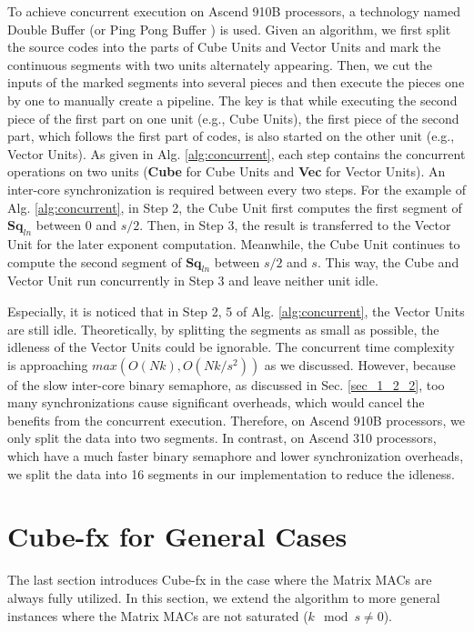 To achieve concurrent execution on Ascend 910B processors, a technology named Double Buffer (or Ping Pong Buffer \cite{DBLP:conf/infocom/JooM98}) is used. Given an algorithm, we first split the source codes into the parts of Cube Units and Vector Units and mark the continuous segments with two units alternately appearing. Then, we cut the inputs of the marked segments into several pieces and then execute the pieces one by one to manually create a pipeline. The key is that while executing the second piece of the first part on one unit (e.g., Cube Units), the first piece of the second part, which follows the first part of codes, is also started on the other unit (e.g., Vector Units). As given in Alg. \ref{alg:concurrent}, each step contains the concurrent operations on two units (\textbf{Cube} for Cube Units and \textbf{Vec} for Vector Units). An inter-core synchronization is required between every two steps. For the example of Alg. \ref{alg:concurrent}, in Step 2, the Cube Unit first computes the first segment of $\textbf{Sq}_{ln}$ between $0$ and $s / 2$. Then, in Step 3, the result is transferred to the Vector Unit for the later exponent computation. Meanwhile, the Cube Unit continues to compute the second segment of $\textbf{Sq}_{ln}$ between $s / 2$ and $s$. This way, the Cube and Vector Unit run concurrently in Step 3 and leave neither unit idle.

Especially, it is noticed that in Step 2, 5 of Alg. \ref{alg:concurrent}, the Vector Units are still idle. Theoretically, by splitting the segments as small as possible, the idleness of the Vector Units could be ignorable. The concurrent time complexity is approaching $max(O(Nk), O(Nk / s^2))$ as we discussed. However, because of the slow inter-core binary semaphore, as discussed in Sec. \ref{sec_1_2_2}, too many synchronizations cause significant overheads, which would cancel the benefits from the concurrent execution. Therefore, on Ascend 910B processors, we only split the data into two segments. In contrast, on Ascend 310 processors, which have a much faster binary semaphore and lower synchronization overheads, we split the data into 16 segments in our implementation to reduce the idleness.

\section{Cube-fx for General Cases \label{sec:4}}

The last section introduces Cube-fx in the case where the Matrix MACs are always fully utilized. In this section, we extend the algorithm to more general instances where the Matrix MACs are not saturated ($k \mod s \neq 0$).

